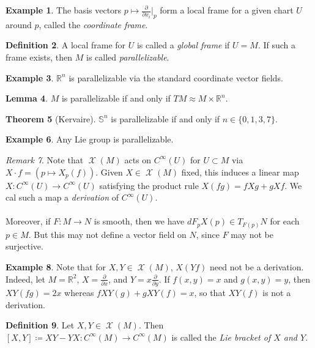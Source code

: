 \documentclass[10pt,letterpaper,cm]{nupset}
\theoremstyle{definition}
\newtheorem{definition}{Definition}[subsection]
\newtheorem{exmp}[definition]{Example}
\theoremstyle{theorem}
\newtheorem{theorem}[definition]{Theorem}
\newtheorem{lemma}[definition]{Lemma}
\theoremstyle{remark}
\newtheorem{remark}[definition]{Remark}
\newcommand{\R}{\mathbb R}
\renewcommand{\S}{\mathbb S}
\newcommand{\1}{\mathbf{1}}
\newcommand{\0}{\vec 0}
\DeclareMathOperator{\vf}{\mathscr{X}}
\begin{document}
\begin{exmp}
The basis vectors $p\mapsto \frac{\partial}{\partial{x_i}}\rvert_p$ form a local frame for a given chart $U$ around $p$, called the \textit{coordinate frame}.
\end{exmp}

\begin{definition}
A  local frame for $U$ is called a \textit{global frame} if $U =M$. If such a frame exists, then $M$ is called \textit{parallelizable}.
\end{definition}

\begin{exmp}
$\R^n$ is parallelizable via the standard coordinate vector fields.
\end{exmp}

\begin{lemma}
$M$ is parallelizable if and only if $TM \approx M \times \R^n$.
\end{lemma}

\begin{theorem}[Kervaire]
$\S^n$ is parallelizable if and only if $n\in \{0, 1, 3, 7\}$.
\end{theorem}

\begin{exmp}
Any Lie group is parallelizable. 
\end{exmp}

\begin{remark}
Note that $\vf(M)$ acts on $C^{\infty}(U)$ for $U \subset M$ via $X \cdot f = (p \mapsto X_p(f))$. Given $X \in \vf(M)$ fixed, this induces a linear map $X : C^{\infty}(U) \to C^{\infty}(U)$ satisfying the product rule $X(fg) = fXg  + gXf$. We cal such a map a \textit{derivation} of $C^{\infty}(U)$.
\\ \\ Moreover, if $F: M \to N$ is smooth, then we have $dF_pX(p) \in T_{F(p)}N$ for each $p \in M$. But this may not define a vector field on $N$, since $F$ may not be surjective.
\end{remark}

\begin{exmp}
Note that for $X, Y \in \vf(M)$, $X(Yf)$ need not be a derivation. Indeed, let $M= \R^2$, $X= \frac{\partial}{\partial{x}}$, and $Y = x \frac{\partial}{\partial{y}}$. If $f(x,y)=x$ and $g(x, y) = y$, then $XY(fg) = 2x$ whereas $fXY(g) + gXY(f) = x$, so that $XY(f)$ is not a derivation.
\end{exmp}

\begin{definition}
Let $X, Y \in \vf(M)$. Then $[X, Y] \coloneqq  XY - YX : C^{\infty}(M)\to C^{\infty}(M)$ is called the \textit{Lie bracket of $X$ and $Y$}.
\end{definition}
\end{document}
